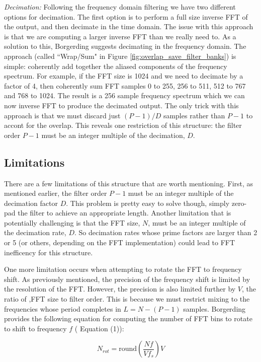 \documentclass[12pt]{report}
\begin{document}
\emph{Decimation:} Following the frequency domain filtering we have two
different options for decimation. The first option is to perform a full size
inverse FFT of the output, and then decimate in the time domain. The issue with
this approach is that we are computing a larger inverse FFT than we really need
to. As a solution to this, Borgerding suggests decimating in the frequency
domain. The approach (called ``Wrap/Sum" in Figure
\ref{fig:overlap_save_filter_banks}) is simple: coherently add together the aliased
components of the frequency spectrum.  For example, if the FFT size is 1024 and
we need to decimate by a factor of 4, then coherently sum FFT samples 0 to 255,
256 to 511, 512 to 767 and 768 to 1024.  The result is a 256 sample frequency
spectrum which we can now inverse FFT to produce the decimated output. The only
trick with this approach is that we must discard just $(P-1)/D$ samples rather
than $P-1$ to accont for the overlap.  This reveals one restriction of this
structure: the filter order $P-1$ must be an integer multiple of the
decimation, $D$.

\subsection{Limitations}
\label{sec:os_limitations}
There are a few limitations of this structure that are worth mentioning. First,
as mentioned earlier, the filter order $P-1$ must be an integer multiple of the
decimation factor $D$. This problem is pretty easy to solve though, simply
zero-pad the filter to achieve an appropriate length. Another limitation that
is potentially challenging is that the FFT size, $N$, must be an integer
multiple of the decimation rate, $D$. So decimation rates whose prime factors
are larger than 2 or 5 (or others, depending on the FFT implementation) could
lead to FFT inefficency for this structure.

One more limitation occurs when attempting to rotate the FFT to frequency
shift.  As previously mentioned, the precision of the frequency shift is
limited by the resolution of the FFT. However, the precision is also limited
further by $V$, the ratio of ,FFT size to filter order. This is because we must
restrict mixing to the frequencies whose period completes in $L=N-(P-1)$
samples. Borgerding provides the following equation for computing the number of
FFT bins to rotate to shift to frequency $f$ (\cite{Borgerding1} Equation (1)):

\begin{equation*}
    N_{rot} = \text{round}\left( \frac{Nf}{Vf_s} \right) V
\end{equation*}
\end{document}
